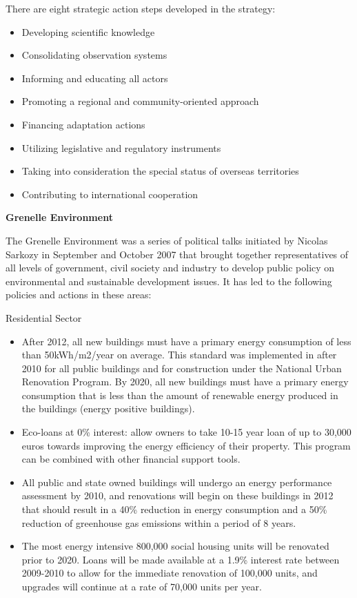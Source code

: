 There are eight strategic action steps developed in the strategy:
\begin{itemize}
	\item Developing scientific knowledge
	\item Consolidating observation systems
	\item Informing and educating all actors
	\item Promoting a regional and community-oriented approach
	\item Financing adaptation actions
	\item Utilizing legislative and regulatory instruments
	\item Taking into consideration the special status of overseas territories
	\item Contributing to international cooperation
\end{itemize}



\textbf{Grenelle Environment}



The Grenelle Environment was a series of political talks initiated by Nicolas Sarkozy in September and October 2007 that brought together representatives of all levels of government, civil society and industry to develop public policy on environmental and sustainable development issues. 
It has led to the following policies and actions in these areas:


Residential Sector
\begin{itemize}
	\item After 2012, all new buildings must have a primary energy consumption of less than 50kWh/m2/year on average. This standard was implemented in after 2010 for all public buildings and for construction under the National Urban Renovation Program. By 2020, all new buildings must have a primary energy consumption that is less than the amount of renewable energy produced in the buildings (energy positive buildings).
	\item Eco-loans at 0\% interest: allow owners to take 10-15 year loan of up to 30,000 euros towards improving the energy efficiency of their property. This program can be combined with other financial support tools.
	\item All public and state owned buildings will undergo an energy performance assessment by 2010,  and renovations will begin on these buildings in 2012 that should result in a 40\% reduction in energy consumption and a 50\% reduction of greenhouse gas emissions within a period of 8 years.
	\item The most energy intensive 800,000 social housing units will be renovated prior to 2020. Loans will be made available at a 1.9\% interest rate between 2009-2010 to allow for the immediate renovation of 100,000 units, and upgrades will continue at a rate of 70,000 units per year.
\end{itemize}



